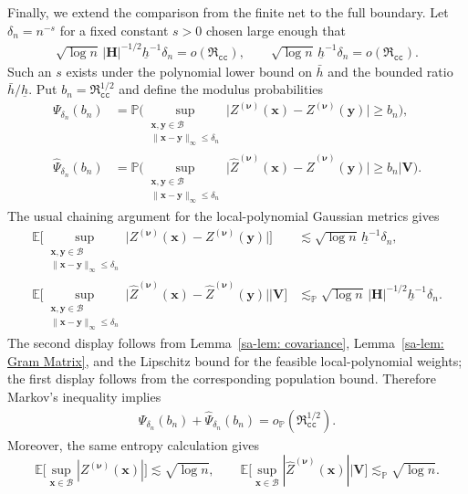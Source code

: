 \documentclass[10pt]{article}
\renewcommand{\P}{\mathbb{P}}
\newcommand{\E}{\mathbb{E}}
\newcommand{\infnorm}[1]{\lVert #1 \rVert_{\infty}}
\newcommand{\lessp}{\lesssim_{\mathbb{P}}}
\newcommand{\bH}{\mathbf{H}}
\newcommand{\bV}{\mathbf{V}}
\newcommand{\bx}{\mathbf{x}}
\newcommand{\by}{\mathbf{y}}
\newcommand{\bnu}{\boldsymbol{\nu}}
\newcommand{\B}{\mathcal{B}}
\begin{document}
Finally, we extend the comparison from the finite net to the full boundary. Let $\delta_n=n^{-s}$ for a fixed constant $s>0$ chosen large enough that
\begin{align*}
    \sqrt{\log n}\,|\bH|^{-1/2}\underline h^{-1}\delta_n=o(\mathfrak{R}_{\mathtt{cc}}),
    \qquad
    \sqrt{\log n}\,\underline h^{-1}\delta_n=o(\mathfrak{R}_{\mathtt{cc}}).
\end{align*}
Such an $s$ exists under the polynomial lower bound on $\bar h$ and the bounded ratio $\bar h/\underline h$. Put $b_n=\mathfrak{R}_{\mathtt{cc}}^{1/2}$ and define the modulus probabilities
\begin{align*}
    \Psi_{\delta_n}(b_n)
    &= \P \Big(\sup_{\substack{\bx,\by \in \B \\ \infnorm{\bx - \by} \leq \delta_n}} \big|Z^{(\bnu)}(\bx) - Z^{(\bnu)}(\by)\big| \geq b_n \Big),\\
    \widehat{\Psi}_{\delta_n}(b_n)
    &= \P \Big(\sup_{\substack{\bx,\by \in \B \\ \infnorm{\bx - \by} \leq \delta_n}} \big|\widehat{Z}^{(\bnu)}(\bx) - \widehat{Z}^{(\bnu)}(\by)\big| \geq b_n \Big| \bV \Big).
\end{align*}
The usual chaining argument for the local-polynomial Gaussian metrics gives
\begin{align*}
    \E \Big[\sup_{\substack{\bx,\by \in \B \\ \infnorm{\bx - \by}\leq \delta_n}} \big|Z^{(\bnu)}(\bx) - Z^{(\bnu)}(\by)\big|\Big]
    &\lesssim \sqrt{\log n}\,\underline h^{-1}\delta_n,\\
    \E \Big[\sup_{\substack{\bx,\by \in \B \\ \infnorm{\bx - \by}\leq \delta_n}} \big|\widehat{Z}^{(\bnu)}(\bx) - \widehat{Z}^{(\bnu)}(\by)\big| \Big| \bV \Big]
    &\lessp \sqrt{\log n}\,|\bH|^{-1/2}\underline h^{-1}\delta_n.
\end{align*}
The second display follows from Lemma~\ref{sa-lem: covariance}, Lemma~\ref{sa-lem: Gram Matrix}, and the Lipschitz bound for the feasible local-polynomial weights; the first display follows from the corresponding population bound. Therefore Markov's inequality implies
\begin{align*}
    \Psi_{\delta_n}(b_n)+\widehat{\Psi}_{\delta_n}(b_n)=o_{\P}(\mathfrak{R}_{\mathtt{cc}}^{1/2}).
\end{align*}
Moreover, the same entropy calculation gives
\[
    \E\Big[\sup_{\bx\in\B}|Z^{(\bnu)}(\bx)|\Big]\lesssim\sqrt{\log n},
    \qquad
    \E\Big[\sup_{\bx\in\B}|\widehat Z^{(\bnu)}(\bx)|\Big|\bV\Big]\lessp\sqrt{\log n}.
\]
\end{document}
